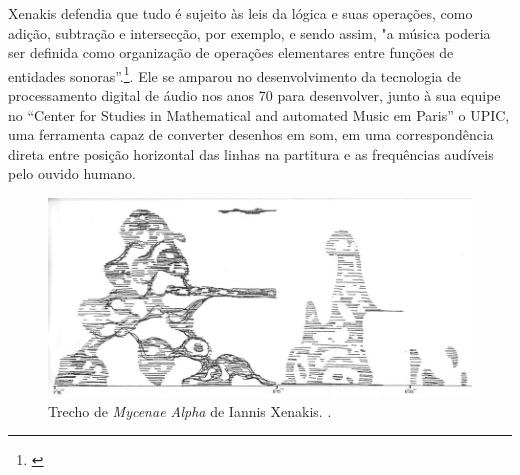 Xenakis defendia que tudo é sujeito às leis da lógica e suas operações, como adição, subtração e intersecção, por exemplo, e sendo assim, "a música poderia ser definida como organização de operações elementares entre funções de entidades sonoras”.\footnote{\cite[21]{Xenakis1971}}. Ele se amparou no desenvolvimento da tecnologia de processamento digital de áudio nos anos 70 para desenvolver, junto à sua equipe no ``Center for Studies in Mathematical and automated Music em Paris'' o UPIC, uma ferramenta capaz de converter desenhos em som, em uma correspondência direta entre posição horizontal das linhas na partitura e as frequências audíveis pelo ouvido humano.


\begin{figure}
    \caption{\label{xenakis}Trecho de \textit{Mycenae Alpha} de Iannis Xenakis.
.}
    
        \includegraphics[width=1\linewidth]{pictures/cap2/metastasis}
    
\end{figure}


    
    


